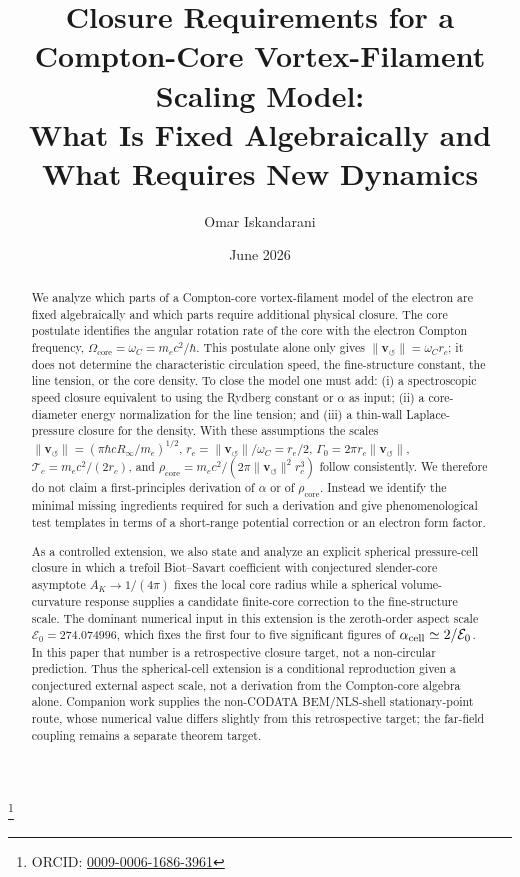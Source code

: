 \documentclass[aps,pra,preprint,longbibliography,nofootinbib]{revtex4-2}
\newcommand{\Et}{\mathcal{E}_0}                    %
\newcommand{\AK}{A_K}                                %
\begin{document}
\title{Closure Requirements for a Compton-Core Vortex-Filament Scaling Model:\\
       What Is Fixed Algebraically and What Requires New Dynamics}

\author{Omar Iskandarani}
\thanks{ORCID: \href{https://orcid.org/0009-0006-1686-3961}{0009-0006-1686-3961}}
\date{June 2026}


\begin{abstract}
We analyze which parts of a Compton-core vortex-filament model of the
electron are fixed algebraically and which parts require additional
physical closure.  The core postulate identifies the angular rotation
rate of the core with the electron Compton frequency,
$\Omega_{\mathrm{core}}=\omega_C=m_e c^2/\hbar$.  This postulate alone
only gives $\lVert \mathbf{v}_{\!\boldsymbol{\circlearrowleft}}\rVert=\omega_C r_c$;
it does not determine the characteristic circulation speed, the
fine-structure constant, the line tension, or the core density.  To close
the model one must add: (i) a spectroscopic speed closure equivalent to
using the Rydberg constant or $\alpha$ as input; (ii) a core-diameter
energy normalization for the line tension; and (iii) a thin-wall
Laplace-pressure closure for the density.  With these assumptions the
scales
$\lVert \mathbf{v}_{\!\boldsymbol{\circlearrowleft}}\rVert=(\pi\hbar cR_\infty/m_e)^{1/2}$,
$r_c=\lVert \mathbf{v}_{\!\boldsymbol{\circlearrowleft}}\rVert/\omega_C=r_e/2$,
$\Gamma_0=2\pi r_c\lVert \mathbf{v}_{\!\boldsymbol{\circlearrowleft}}\rVert$,
$\mathcal{T}_c=m_ec^2/(2r_c)$, and
$\rho_{\mathrm{core}}=m_ec^2/(2\pi\lVert \mathbf{v}_{\!\boldsymbol{\circlearrowleft}}\rVert^2r_c^3)$
follow consistently.  We therefore do not claim a first-principles
derivation of $\alpha$ or of $\rho_{\mathrm{core}}$.  Instead we identify
the minimal missing ingredients required for such a derivation and give
phenomenological test templates in terms of a short-range potential
correction or an electron form factor.

As a controlled extension, we also state and analyze an explicit spherical
pressure-cell closure in which a trefoil Biot--Savart coefficient with
conjectured slender-core asymptote $\AK\to1/(4\pi)$ fixes the local core
radius while a spherical volume-curvature response supplies a candidate
finite-core correction to the fine-structure scale.  The dominant numerical input in this extension is the zeroth-order aspect scale
$\Et=274.074996$, which fixes the first four to five significant figures of
$\alpha_{\rm cell}\simeq2/\Et$.  In this paper that number is a retrospective
closure target, not a non-circular prediction.  Thus the spherical-cell extension
is a conditional reproduction given a conjectured external aspect scale, not a
derivation from the Compton-core algebra alone.  Companion work supplies the
non-CODATA BEM/NLS-shell stationary-point route, whose numerical value differs
slightly from this retrospective target; the far-field coupling remains a
separate theorem target.

\end{abstract}
\end{document}
